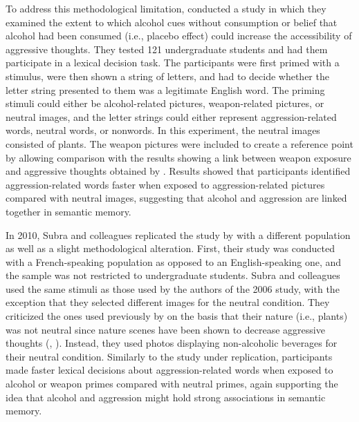 \documentclass[serif, authordate, twocolumn, empirical]{jote-article}
\begin{document}
To address this methodological limitation, \textcite{BartholowHeinz2006} conducted a study in which they examined the extent to which alcohol cues without consumption or belief that alcohol had been consumed (i.e., placebo effect) could increase the accessibility of aggressive thoughts. They tested 121 undergraduate students and had them participate in a lexical decision task. The participants were first primed with a stimulus, were then shown a string of letters, and had to decide whether the letter string presented to them was a legitimate English word. The priming stimuli could either be alcohol-related pictures, weapon-related pictures, or neutral images, and the letter strings could either represent aggression-related words, neutral words, or nonwords. In this experiment, the neutral images consisted of plants. The weapon pictures were included to create a reference point by allowing comparison with the results showing a link between weapon exposure and aggressive thoughts obtained by \textcite{AndersonJrJBartholow1998}. Results showed that participants identified aggression-related words faster when exposed to aggression-related pictures compared with neutral images, suggesting that alcohol and aggression are linked together in semantic memory. 

In 2010, Subra and colleagues replicated the study by \textcite{BartholowHeinz2006} with a different population as well as a slight methodological alteration. First, their study was conducted with a French-speaking population as opposed to an English-speaking one, and the sample was not restricted to undergraduate students. Subra and colleagues used the same stimuli as those used by the authors of the 2006 study, with the exception that they selected different images for the neutral condition. They criticized the ones used previously by \textcite{BartholowHeinz2006} on the basis that their nature (i.e., plants) was not neutral since nature scenes have been shown to decrease aggressive thoughts (, ). Instead, they used photos displaying non-alcoholic beverages for their neutral condition. Similarly to the study under replication, participants made faster lexical decisions about aggression-related words when exposed to alcohol or weapon primes compared with neutral primes, again supporting the idea that alcohol and aggression might hold strong associations in semantic memory.
\end{document}
